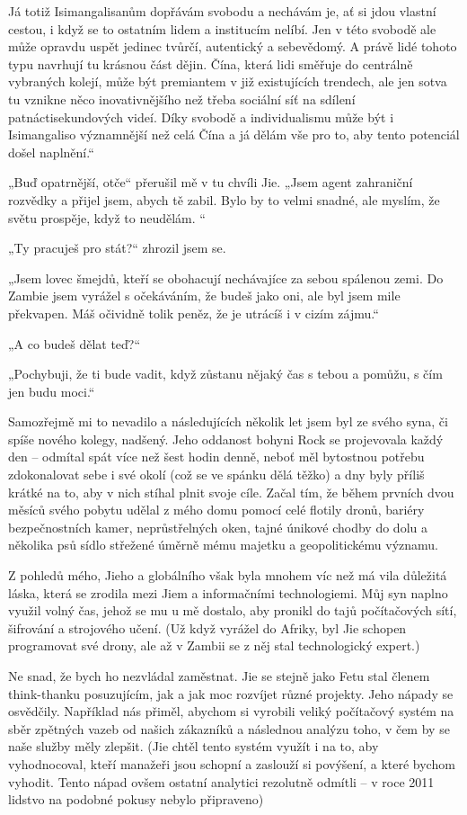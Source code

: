 Já totiž Isimangalisanům dopřávám svobodu a nechávám je, ať si jdou vlastní cestou, i když se to ostatním lidem a institucím nelíbí. Jen v této svobodě ale může opravdu uspět jedinec tvůrčí, autentický a sebevědomý. A právě lidé tohoto typu navrhují tu krásnou část dějin. Čína, která lidi směřuje do centrálně vybraných kolejí, může být premiantem v již existujících trendech‚ ale jen sotva tu vznikne něco inovativnějšího než třeba sociální síť na sdílení patnáctisekundových videí. Díky svobodě a individualismu může být i Isimangaliso významnější než celá Čína a já dělám vše pro to, aby tento potenciál došel naplnění.“

„Buď opatrnější, otče“ přerušil mě v tu chvíli Jie. „Jsem agent zahraniční rozvědky a přijel jsem, abych tě zabil. Bylo by to velmi snadné, ale myslím, že světu prospěje, když to neudělám. “

„Ty pracuješ pro stát?“ zhrozil jsem se.

„Jsem lovec šmejdů, kteří se obohacují  nechávajíce za sebou spálenou zemi. Do Zambie jsem vyrážel s očekáváním, že budeš jako oni, ale byl jsem mile překvapen. Máš očividně tolik peněz, že je utrácíš i v cizím zájmu.“

„A co budeš dělat teď?“

„Pochybuji, že ti bude vadit, když zůstanu nějaký čas s tebou a pomůžu, s čím jen budu moci.“
\vspace{0.75cm}

Samozřejmě mi to nevadilo a následujících několik let jsem byl ze svého syna, či spíše nového kolegy, nadšený. Jeho oddanost bohyni Rock se projevovala každý den – odmítal spát více než šest hodin denně, neboť měl bytostnou potřebu zdokonalovat sebe i své okolí (což se ve spánku dělá těžko) a dny byly příliš krátké na to, aby v nich stíhal plnit svoje cíle. Začal tím, že během prvních dvou měsíců svého pobytu udělal z mého domu pomocí celé flotily dronů, bariéry bezpečnostních kamer, neprůstřelných oken, tajné únikové chodby do dolu a několika psů sídlo střežené úměrně mému majetku a geopolitickému významu.

Z pohledů mého, Jieho a globálního však byla mnohem víc než má vila důležitá láska, která se zrodila mezi Jiem a informačními technologiemi. Můj syn naplno využil volný čas, jehož se mu u mě dostalo, aby pronikl do tajů počítačových sítí, šifrování a strojového učení. (Už když vyrážel do Afriky, byl Jie schopen programovat své drony, ale až v Zambii se z něj stal technologický expert.) 

Ne snad, že bych ho nezvládal zaměstnat. Jie se stejně jako Fetu stal členem think-thanku posuzujícím, jak a jak moc rozvíjet různé projekty. Jeho nápady se osvědčily. Například nás přiměl, abychom si vyrobili veliký počítačový systém na sběr zpětných vazeb od našich zákazníků a následnou analýzu toho, v čem by se naše služby měly zlepšit. (Jie chtěl tento systém využít i na to, aby vyhodnocoval, kteří manažeři jsou schopní a zaslouží si povýšení, a které bychom vyhodit. Tento nápad ovšem ostatní analytici rezolutně odmítli – v roce 2011 lidstvo na podobné pokusy nebylo připraveno) 


